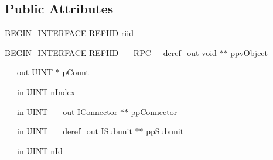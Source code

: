 \subsection*{Public Attributes}
\begin{DoxyCompactItemize}
\item 
B\+E\+G\+I\+N\+\_\+\+I\+N\+T\+E\+R\+F\+A\+CE \hyperlink{px__win__ds_8c_a80ec49c8ae61e234197d5071d2df497d}{R\+E\+F\+I\+ID} \hyperlink{struct_i_device_topology_vtbl_a889bb4c3f428d49897c3d71bc92a238d}{riid}
\item 
B\+E\+G\+I\+N\+\_\+\+I\+N\+T\+E\+R\+F\+A\+CE \hyperlink{px__win__ds_8c_a80ec49c8ae61e234197d5071d2df497d}{R\+E\+F\+I\+ID} \hyperlink{rpcsal_8h_a23bc188526f10656f9c79d950f6c3192}{\+\_\+\+\_\+\+R\+P\+C\+\_\+\+\_\+deref\+\_\+out} \hyperlink{sound_8c_ae35f5844602719cf66324f4de2a658b3}{void} $\ast$$\ast$ \hyperlink{struct_i_device_topology_vtbl_a5fbda440ff0cbc0e9723c9fb5c84eac2}{ppv\+Object}
\item 
\hyperlink{sal_8h_abb4c3c1135aab6c47cff22e7c16efb74}{\+\_\+\+\_\+out} \hyperlink{mapinls_8h_a36cb3b01d81ffd844bbbfb54003e06ec}{U\+I\+NT} $\ast$ \hyperlink{struct_i_device_topology_vtbl_a408195f7b0d2c91aaa32fff15f37d850}{p\+Count}
\item 
\hyperlink{sal_8h_a3f6b8655e1aa9dfc15a9029f0343009e}{\+\_\+\+\_\+in} \hyperlink{mapinls_8h_a36cb3b01d81ffd844bbbfb54003e06ec}{U\+I\+NT} \hyperlink{struct_i_device_topology_vtbl_aa32c6d96f822d89c8b4e5ebd397af956}{n\+Index}
\item 
\hyperlink{sal_8h_a3f6b8655e1aa9dfc15a9029f0343009e}{\+\_\+\+\_\+in} \hyperlink{mapinls_8h_a36cb3b01d81ffd844bbbfb54003e06ec}{U\+I\+NT} \hyperlink{sal_8h_abb4c3c1135aab6c47cff22e7c16efb74}{\+\_\+\+\_\+out} \hyperlink{devicetopology_8h_a51f898e3bb3480805837711f3fcf328b}{I\+Connector} $\ast$$\ast$ \hyperlink{struct_i_device_topology_vtbl_a2b68a777a086913c92507042db2676ac}{pp\+Connector}
\item 
\hyperlink{sal_8h_a3f6b8655e1aa9dfc15a9029f0343009e}{\+\_\+\+\_\+in} \hyperlink{mapinls_8h_a36cb3b01d81ffd844bbbfb54003e06ec}{U\+I\+NT} \hyperlink{sal_8h_a7dec33add44f7afd0eb61b1249a35298}{\+\_\+\+\_\+deref\+\_\+out} \hyperlink{devicetopology_8h_a699f46e395daf19f978800c852f09860}{I\+Subunit} $\ast$$\ast$ \hyperlink{struct_i_device_topology_vtbl_af968531344327d34c13d269c427ed515}{pp\+Subunit}
\item 
\hyperlink{sal_8h_a3f6b8655e1aa9dfc15a9029f0343009e}{\+\_\+\+\_\+in} \hyperlink{mapinls_8h_a36cb3b01d81ffd844bbbfb54003e06ec}{U\+I\+NT} \hyperlink{struct_i_device_topology_vtbl_a5b5c8129f0339326140197b66c0311db}{n\+Id}
$$
\end{DoxyCompactItemize}
